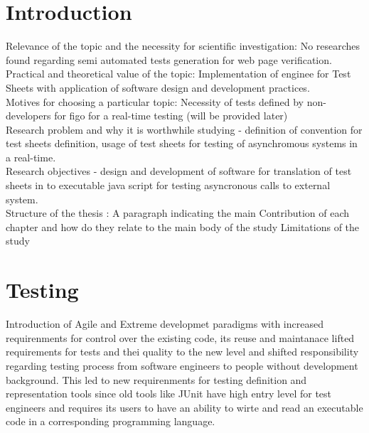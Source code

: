 \documentclass{llncs}
\begin{document}
\section{Introduction}
Relevance of the topic and the necessity for scientific investigation: No researches found regarding semi automated tests generation for web page verification.\\
Practical and theoretical value of the topic: Implementation of enginee for Test Sheets with application of software design and development practices.\\
Motives for choosing a particular topic:  Necessity of tests defined by non-developers for figo for a real-time testing (will be provided later)\\
Research problem and why it is worthwhile studying - definition of convention for test sheets definition, usage of test sheets for testing of asynchromous systems in a real-time.\\
Research objectives - design and development of software for translation of test sheets in to executable java script for testing asyncronous calls to external system.\\


Structure of the thesis : A paragraph indicating the main
 Contribution of each chapter and how do they relate
to the main body of the study
Limitations of the study\\





\section{Testing}
Introduction of Agile and Extreme developmet paradigms with increased requirenments for control over the existing code, its reuse and maintanace lifted requirements for tests and thei quality to the new level and shifted responsibility regarding testing process from software engineers to people without development background. 
This led to new requirenments for testing definition and representation tools since old tools like JUnit have high entry level for test engineers and requires its users to have an ability to wirte and read an executable code in a corresponding programming language.
\end{document}
